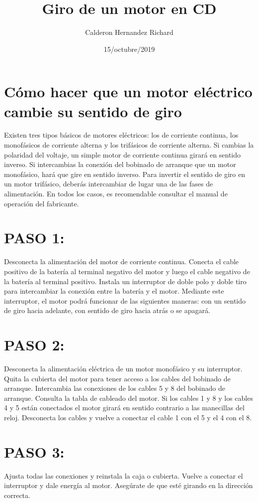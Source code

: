 \documentclass{article}
\title {Giro de un motor en CD}
\author{Calderon Hernandez Richard}
\date{15/octubre/2019}
\begin{document}
\maketitle

\section{Cómo hacer que un motor eléctrico cambie su sentido de giro}
Existen tres tipos básicos de motores eléctricos: los de corriente continua, los monofásicos de corriente alterna y los trifásicos de corriente alterna. Si cambias la polaridad del voltaje, un simple motor de corriente continua girará en sentido inverso. Si intercambias la conexión del bobinado de arranque que un motor monofásico, hará que gire en sentido inverso. Para invertir el sentido de giro en un motor trifásico, deberás intercambiar de lugar una de las fases de alimentación. En todos los casos, es recomendable consultar el manual de operación del fabricante.
\section{PASO 1:}
Desconecta la alimentación del motor de corriente continua. Conecta el cable positivo de la batería al terminal negativo del motor y luego el cable negativo de la batería al terminal positivo. Instala un interruptor de doble polo y doble tiro para intercambiar la conexión entre la batería y el motor. Mediante este interruptor, el motor podrá funcionar de las siguientes maneras: con un sentido de giro hacia adelante, con sentido de giro hacia atrás o se apagará. 

\section{PASO 2:}
Desconecta la alimentación eléctrica de un motor monofásico y su interruptor. Quita la cubierta del motor para tener acceso a los cables del bobinado de arranque. Intercambia las conexiones de los cables 5 y 8 del bobinado de arranque. Consulta la tabla de cableado del motor. Si los cables 1 y 8 y los cables 4 y 5 están conectados el motor girará en sentido contrario a las manecillas del reloj. Desconecta los cables y vuelve a conectar el cable 1 con el 5 y el 4 con el 8.
\section{PASO 3:}
Ajusta todas las conexiones y reinstala la caja o cubierta. Vuelve a conectar el interruptor y dale energía al motor. Asegúrate de que esté girando en la dirección correcta.
\end{document}
